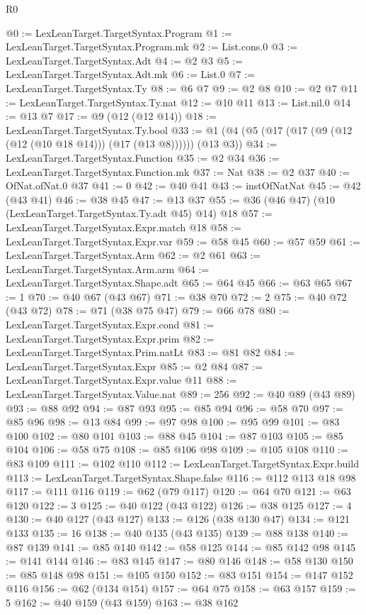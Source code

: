 \begin{lexlean}{R0}
\begin{coremodule}
@0 := LexLeanTarget.TargetSyntax.Program
@1 := LexLeanTarget.TargetSyntax.Program.mk
@2 := List.cons.{0}
@3 := LexLeanTarget.TargetSyntax.Adt
@4 := @2 @3
@5 := LexLeanTarget.TargetSyntax.Adt.mk
@6 := List.{0}
@7 := LexLeanTarget.TargetSyntax.Ty
@8 := @6 @7
@9 := @2 @8
@10 := @2 @7
@11 := LexLeanTarget.TargetSyntax.Ty.nat
@12 := @10 @11
@13 := List.nil.{0}
@14 := @13 @7
@17 := @9 (@12 (@12 @14))
@18 := LexLeanTarget.TargetSyntax.Ty.bool
@33 := @1 (@4 (@5 (@17 (@17 (@9 (@12 (@12 (@10 @18 @14))) (@17 (@13 @8)))))) (@13 @3))
@34 := LexLeanTarget.TargetSyntax.Function
@35 := @2 @34
@36 := LexLeanTarget.TargetSyntax.Function.mk
@37 := Nat
@38 := @2 @37
@40 := OfNat.ofNat.{0} @37
@41 := 0
@42 := @40 @41
@43 := instOfNatNat
@45 := @42 (@43 @41)
@46 := @38 @45
@47 := @13 @37
@55 := @36 (@46 @47) (@10 (LexLeanTarget.TargetSyntax.Ty.adt @45) @14) @18
@57 := LexLeanTarget.TargetSyntax.Expr.match @18
@58 := LexLeanTarget.TargetSyntax.Expr.var
@59 := @58 @45
@60 := @57 @59
@61 := LexLeanTarget.TargetSyntax.Arm
@62 := @2 @61
@63 := LexLeanTarget.TargetSyntax.Arm.arm
@64 := LexLeanTarget.TargetSyntax.Shape.adt
@65 := @64 @45
@66 := @63 @65
@67 := 1
@70 := @40 @67 (@43 @67)
@71 := @38 @70
@72 := 2
@75 := @40 @72 (@43 @72)
@78 := @71 (@38 @75 @47)
@79 := @66 @78
@80 := LexLeanTarget.TargetSyntax.Expr.cond
@81 := LexLeanTarget.TargetSyntax.Expr.prim
@82 := LexLeanTarget.TargetSyntax.Prim.natLt
@83 := @81 @82
@84 := LexLeanTarget.TargetSyntax.Expr
@85 := @2 @84
@87 := LexLeanTarget.TargetSyntax.Expr.value @11
@88 := LexLeanTarget.TargetSyntax.Value.nat
@89 := 256
@92 := @40 @89 (@43 @89)
@93 := @88 @92
@94 := @87 @93
@95 := @85 @94
@96 := @58 @70
@97 := @85 @96
@98 := @13 @84
@99 := @97 @98
@100 := @95 @99
@101 := @83 @100
@102 := @80 @101
@103 := @88 @45
@104 := @87 @103
@105 := @85 @104
@106 := @58 @75
@108 := @85 @106 @98
@109 := @105 @108
@110 := @83 @109
@111 := @102 @110
@112 := LexLeanTarget.TargetSyntax.Expr.build
@113 := LexLeanTarget.TargetSyntax.Shape.false
@116 := @112 @113 @18 @98
@117 := @111 @116
@119 := @62 (@79 @117)
@120 := @64 @70
@121 := @63 @120
@122 := 3
@125 := @40 @122 (@43 @122)
@126 := @38 @125
@127 := 4
@130 := @40 @127 (@43 @127)
@133 := @126 (@38 @130 @47)
@134 := @121 @133
@135 := 16
@138 := @40 @135 (@43 @135)
@139 := @88 @138
@140 := @87 @139
@141 := @85 @140
@142 := @58 @125
@144 := @85 @142 @98
@145 := @141 @144
@146 := @83 @145
@147 := @80 @146
@148 := @58 @130
@150 := @85 @148 @98
@151 := @105 @150
@152 := @83 @151
@154 := @147 @152 @116
@156 := @62 (@134 @154)
@157 := @64 @75
@158 := @63 @157
@159 := 5
@162 := @40 @159 (@43 @159)
@163 := @38 @162

\end{coremodule}
\end{lexlean}
